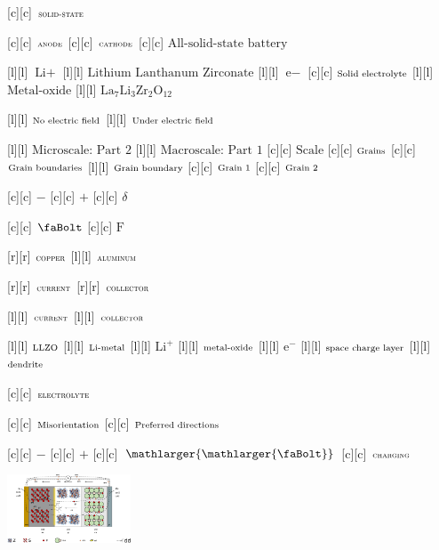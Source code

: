 [c][c] {$\textsc{\scriptsize solid-state}$}

[c][c] {$\textsc{\scriptsize anode}$}
[c][c] {$\textsc{\scriptsize cathode}$}
[c][c] {$\text{All-solid-state battery}$}

[l][l] {$\text{Li}+$}
[l][l] {$\text{Lithium Lanthanum Zirconate}$}
[l][l] {$\text{e}-$}
[c][c] {$\text{\scriptsize Solid electrolyte}$}
[l][l] {$\text{Metal-oxide}$}
[l][l] {$\text{La}_{7}\text{Li}_{3}\text{Zr}_{2}\text{O}_{12}$}

[l][l] {$\text{\scriptsize  No electric field}$}
[l][l] {$\text{\scriptsize  Under electric field}$}

[l][l] {$\text{Microscale: Part 2}$}
[l][l] {$\text{Macroscale: Part 1}$}
[c][c] {$\text{Scale}$}
[c][c] {$\text{\scriptsize Grains}$}
[c][c] {$\text{\scriptsize Grain boundaries}$}
[l][l] {$\text{\scriptsize Grain boundary}$}
[c][c] {$\text{\scriptsize Grain 1}$}
[c][c] {$\text{\scriptsize Grain 2}$}

[c][c] {$-$}
[c][c] {$+$}
[c][c] {$\delta$}

[c][c] {$\text{\faBolt}$}
[c][c] {$\text{F}$}

[r][r] {$\scriptsize  \textsc{copper}$}
[l][l] {$\scriptsize  \textsc{aluminum}$}

[r][r] {$\scriptsize  \textsc{current}$}
[r][r] {$\scriptsize  \textsc{collector}$}

[l][l] {$\scriptsize  \textsc{current}$}
[l][l] {$\scriptsize  \textsc{collector}$}

[l][l] {$\scriptsize \text{LLZO}$}
[l][l] {$\scriptsize \text{Li-metal}$}
[l][l] {\scriptsize $\text{Li}^{+}$}
[l][l] {$\scriptsize \text{metal-oxide}$}
[l][l] {\scriptsize $\text{e}^{-}$}
[l][l] {$\scriptsize \text{space charge layer}$}
[l][l] {$\scriptsize \text{dendrite}$}

[c][c] {$\scriptsize  \textsc{electrolyte}$}

[c][c] {$\scriptsize  \text{Misorientation}$}
[c][c] {$\scriptsize  \text{Preferred directions}$}

[c][c] {\scriptsize $-$}
[c][c] {\scriptsize $+$}
[c][c] {\scriptsize $\mathlarger{\mathlarger{\text{\faBolt}}}$}
[c][c] {$\scriptsize  \textsc{charging}$}

\includegraphics[width=0.275\textwidth]{dendrite_pdirection_battonly.eps}
